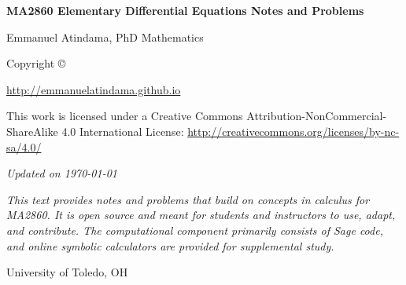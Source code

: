 \begin{titlepage}
\begin{fullwidth}
\thispagestyle{empty}
\setlength{\parindent}{0pt}
\setlength{\parskip}{1em}

\begin{center}
\vspace*{3cm}

{\Huge\bfseries MA2860 Elementary Differential Equations Notes and Problems}

\vspace{1.5cm}

{\Large Emmanuel Atindama, PhD Mathematics}

\vfill

Copyright \copyright\ \the\year\ \thanklessauthor

\par{}

\par\url{http://emmanuelatindama.github.io}

\par This work is licensed under a Creative Commons Attribution-NonCommercial-ShareAlike 4.0 International License:  
\url{http://creativecommons.org/licenses/by-nc-sa/4.0/}

\par\textit{\ver \quad Updated on \today}

\vfill

\begin{minipage}{0.85\textwidth}
\centering
\small
\textit{This text provides notes and problems that build on concepts in calculus for MA2860. It is open source and meant for students and instructors to use, adapt, and contribute. The computational component primarily consists of Sage code, and online symbolic calculators are provided for supplemental study.}
\end{minipage}

\vfill

University of Toledo, OH \\
\monthyear

\end{center}
\end{fullwidth}
\end{titlepage}

\cleardoublepage
\tableofcontents
\cleardoublepage

